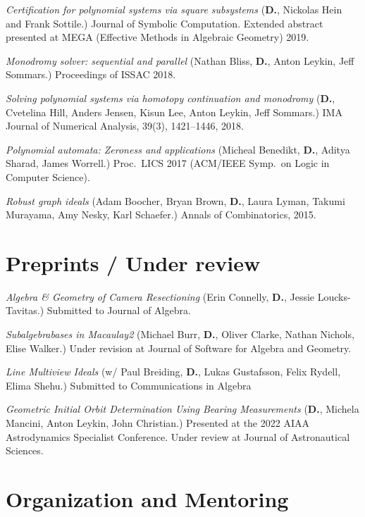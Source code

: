 \documentclass[margin,line,pifont,palatino,courier]{res}
\newcommand{\D}{\textbf{D.}}
\begin{document}
\begin{resume}
    \textit{Certification for polynomial systems via square subsystems}
    (\D, Nickolas Hein and Frank Sottile.)
    Journal of Symbolic Computation. Extended abstract presented at MEGA (Effective Methods in Algebraic Geometry) 2019.

    \textit{Monodromy solver: sequential and parallel}
    (Nathan Bliss, \D, Anton Leykin, Jeff Sommars.)
    Proceedings of ISSAC 2018.
    
    \textit{Solving polynomial systems via homotopy continuation and monodromy}
    (\D, Cvetelina Hill, Anders Jensen, Kisun Lee, Anton Leykin, Jeff Sommars.)
    IMA Journal of Numerical Analysis, 39(3), 1421--1446, 2018.

    \textit{Polynomial automata: Zeroness and applications}
    (Micheal Benedikt, \D, Aditya Sharad, James Worrell.)
    Proc.~LICS 2017 (ACM/IEEE Symp.~on Logic in Computer Science).
    
    \textit{Robust graph ideals}
    (Adam Boocher, Bryan Brown, \D, Laura Lyman, Takumi Murayama, Amy Nesky, Karl Schaefer.)
    Annals of Combinatorics, 2015.

\section{\sc Preprints / Under review}

\textit{Algebra \& Geometry of Camera Resectioning} (Erin Connelly,
\D, Jessie Loucks-Tavitas.)
Submitted to Journal of Algebra.

\textit{Subalgebrabases in Macaulay2} (Michael Burr, \D, Oliver
Clarke, Nathan Nichols, Elise Walker.) Under revision at Journal of Software for Algebra and Geometry.

\textit{Line Multiview Ideals}
(w/ Paul Breiding, \D, Lukas Gustafsson, Felix Rydell, Elima Shehu.) Submitted to Communications in Algebra

\textit{Geometric Initial Orbit Determination Using Bearing Measurements}
(\D, Michela Mancini, Anton Leykin, John Christian.)
Presented at the 2022 AIAA Astrodynamics Specialist Conference.
Under review at Journal of Astronautical Sciences.


\section{\sc Organization and Mentoring}


\end{resume}
\end{document}
